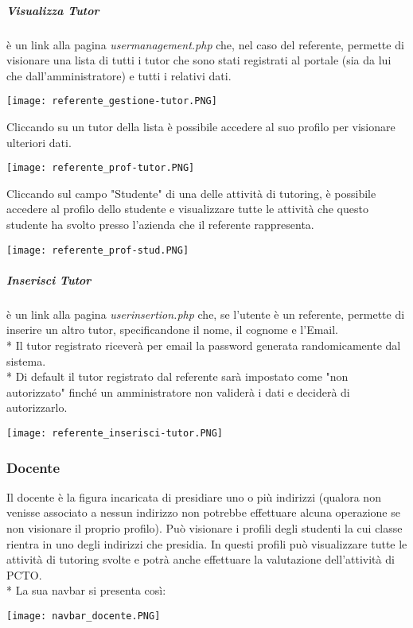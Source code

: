 \documentclass[12pt]{article}
\begin{document}
\subparagraph{Visualizza Tutor}  è un link alla pagina \textit{usermanagement.php} che, nel caso del referente, permette di visionare una lista di tutti i tutor che sono stati registrati al portale (sia da lui che dall'amministratore) e tutti i relativi dati.
\begin{center}
    \texttt{[image: referente\_gestione-tutor.PNG]}
\end{center}
Cliccando su un tutor della lista è possibile accedere al suo profilo per visionare ulteriori dati.
\begin{center}
    \texttt{[image: referente\_prof-tutor.PNG]}
\end{center}
Cliccando sul campo "Studente" di una delle attività di tutoring, è possibile accedere al profilo dello studente e visualizzare tutte le attività che questo studente ha svolto presso l'azienda che il referente rappresenta.
\begin{center}
    \texttt{[image: referente\_prof-stud.PNG]}
\end{center}

\subparagraph{Inserisci Tutor} è un link alla pagina \textit{userinsertion.php} che, se l'utente è un referente, permette di inserire un altro tutor, specificandone il nome, il cognome e l'Email. \\*
Il tutor registrato riceverà per email la password generata randomicamente dal sistema.\\*
Di default il tutor registrato dal referente sarà impostato come "non autorizzato" finché un amministratore non validerà i dati e deciderà di autorizzarlo.
\begin{center}
    \texttt{[image: referente\_inserisci-tutor.PNG]}
\end{center}
\bigskip





\subsubsection{Docente}
Il docente è la figura incaricata di presidiare uno o più indirizzi (qualora non venisse associato a nessun indirizzo non potrebbe effettuare alcuna operazione se non visionare il proprio profilo). Può visionare i profili degli studenti la cui classe rientra in uno degli indirizzi che presidia. In questi profili può visualizzare tutte le attività di tutoring svolte e potrà anche effettuare la valutazione dell'attività di PCTO.\\*
La sua navbar si presenta così:
\begin{center}
    \texttt{[image: navbar\_docente.PNG]}
\end{center}
\bigskip
\end{document}
